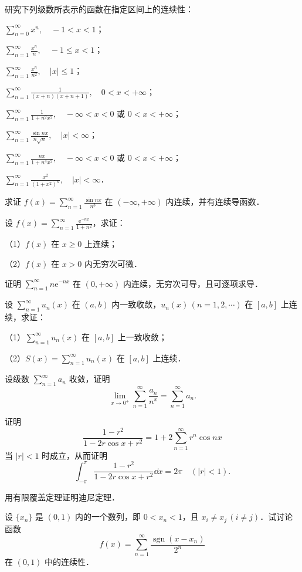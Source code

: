 \begin{xiti}
\item 研究下列级数所表示的函数在指定区间上的连续性：
\begin{ziti}
\item $\displaystyle\sum_{n=0}^{\infty}x^{n},\quad-1<x<1$；
\item $\displaystyle\sum_{n=1}^{\infty}\frac{x^{n}}{n},\quad-1\leqslant x<1$；
\item $\displaystyle\sum_{n=1}^{\infty}\frac{x^{n}}{n^{2}},\quad\left|x\right|\leqslant 1$；
\item $\displaystyle\sum_{n=1}^{\infty}\frac{1}{(x+n)(x+n+1)},\quad 0<x<+\infty$；
\item $\displaystyle\sum_{n=1}^{\infty}\frac{1}{1+n^{2}x^{2}},\quad-\infty<x<0$ 或 $0<x<+\infty$；
\item $\displaystyle\sum_{n=1}^{\infty}\frac{\sin nx}{n\sqrt{n}},\quad\left|x\right|<\infty$；
\item $\displaystyle\sum_{n=1}^{\infty}\frac{nx}{1+n^{4}x^{2}},\quad-\infty<x<0$ 或 $0<x<+\infty$；
\item $\displaystyle\sum_{n=1}^{\infty}\frac{x^{2}}{\left(1+x^{2}\right)^{n}},\quad\left|x\right|<\infty$．
\end{ziti}
\item 求证 $f(x)=\displaystyle\sum_{n=1}^{\infty}\frac{\sin nx}{n^{3}}$ 在 $(-\infty,+\infty)$ 内连续，并有连续导函数．
\item 设 $f(x)=\displaystyle\sum_{n=1}^{\infty}\frac{\mathrm{e}^{-nx}}{1+n^{2}}$，求证：\par
（1）$f(x)$ 在 $x\geqslant 0$ 上连续；\par
（2）$f(x)$ 在 $x>0$ 内无穷次可微．
\item 证明 $\displaystyle\sum_{n=1}^{\infty}n\mathrm{e}^{-nx}$ 在 $(0,+\infty)$ 内连续，无穷次可导，且可逐项求导．
\item 设 $\displaystyle\sum_{n=1}^{\infty}u_{n}(x)$ 在 $(a,b)$ 内一致收敛，$u_{n}(x)\,(n=1,2,\cdots)$ 在 $[a,b]$ 上连续，求证：\par
（1）$\displaystyle\sum_{n=1}^{\infty}u_{n}(x)$ 在 $[a,b]$ 上一致收敛；\par
（2）$S(x)=\displaystyle\sum_{n=1}^{\infty}u_{n}(x)$ 在 $[a,b]$ 上连续．
\item 设级数 $\displaystyle\sum_{n=1}^{\infty}a_{n}$ 收敛，证明
\[
\lim_{x\to 0^{+}}\sum_{n=1}^{\infty}\frac{a_{n}}{n^{x}}=\sum_{n=1}^{\infty}a_{n}.
\]
\item 证明
\[
\frac{1-r^{2}}{1-2r\cos x+r^{2}}=1+2\sum_{n=1}^{\infty}r^{n}\cos nx
\]
当 $\left|r\right|<1$ 时成立，从而证明
\[
\int_{-\pi}^{\pi}\frac{1-r^{2}}{1-2r\cos x+r^{2}}\dd x=2\pi\quad(\left|r\right|<1).
\]
\item 用有限覆盖定理证明迪尼定理．
\item 设 $\{x_{n}\}$ 是 $(0,1)$ 内的一个数列，即 $0<x_{n}<1$，且 $x_{i}\neq x_{j}\,(i\neq j)$．试讨论函数
\[
f(x)=\sum_{n=1}^{\infty}\frac{\operatorname{sgn}(x-x_{n})}{2^{n}}
\]
在 $(0,1)$ 中的连续性．
\end{xiti}
